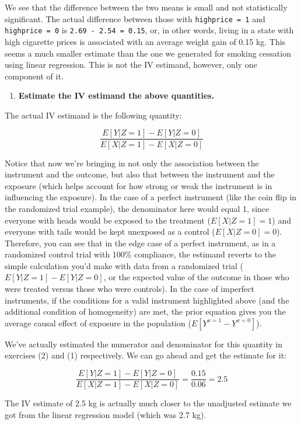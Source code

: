 \documentclass[
]{book}
\providecommand{\tightlist}{%
  \setlength{\itemsep}{0pt}\setlength{\parskip}{0pt}}
\begin{document}
We see that the difference between the two means is small and not statistically significant. The actual difference between those with \texttt{highprice\ =\ 1} and \texttt{highprice\ =\ 0} is \texttt{2.69\ -\ 2.54\ =\ 0.15}, or, in other words, living in a state with high cigarette prices is associated with an average weight gain of 0.15 kg. This seems a much smaller estimate than the one we generated for smoking cessation using linear regression. This is not the IV estimand, however, only one component of it.

\begin{enumerate}
\def\labelenumi{\arabic{enumi}.}
\setcounter{enumi}{2}
\tightlist
\item
  \textbf{Estimate the IV estimand the above quantities.}
\end{enumerate}

The actual IV estimand is the following quantity:

\[
\frac{E[Y|Z=1] - E[Y|Z=0]}{E[X|Z=1] - E[X|Z=0]}
\]

Notice that now we're bringing in not only the association between the instrument
and the outcome, but also that between the instrument and the exposure (which
helps account for how strong or weak the instrument is in influencing the
exposure). In the case of a perfect instrument (like the coin flip in the
randomized trial example), the denominator here would equal 1, since
everyone with heads would be exposed to the treatment (\(E[X|Z=1] = 1\)) and
everyone with tails would be kept unexposed as a control (\(E[X|Z=0] = 0\)).
Therefore, you can see that in the edge case of a perfect instrument, as in
a randomized control trial with 100\% compliance, the estimand reverts to the simple calculation
you'd make with data from a randomized trial (\(E[Y|Z=1] - E[Y|Z=0]\), or the
expected value of the outcome in those who were treated versus those who were
controls).
In the case of imperfect instruments, if the conditions for a valid instrument highlighted above (and the additional condition of homogeneity) are met, the prior equation gives you the average causal effect of exposure in the population (\(E[Y^{x=1} - Y^{x=0}]\)).

We've actually estimated the numerator and denominator for this quantity in exercises (2) and (1) respectively. We can go ahead and get the estimate for it:

\[
\frac{E[Y|Z=1] - E[Y|Z=0]}{E[X|Z=1] - E[X|Z=0]}=\frac{0.15}{0.06} = 2.5 
\]

The IV estimate of 2.5 kg is actually much closer to the unadjusted estimate we got from the linear regression model (which was 2.7 kg).
\end{document}
